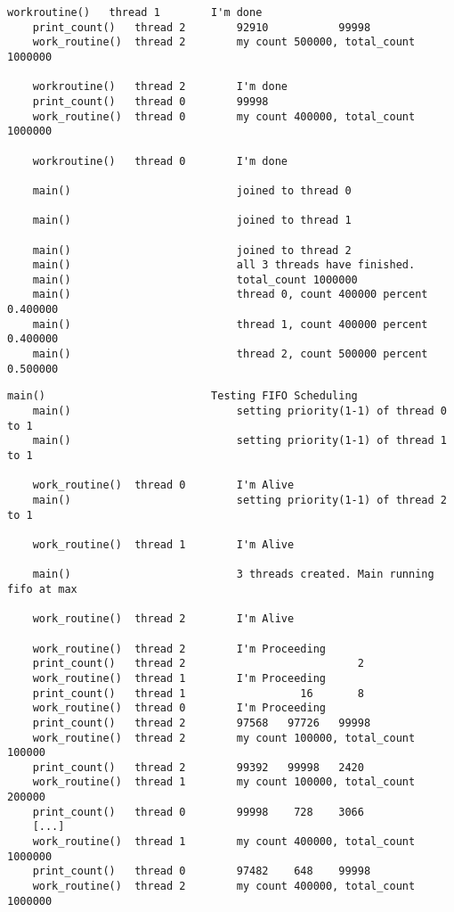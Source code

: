 \begin{parts}
\begin{solution}
\begin{Verbatim}[label={\$ sudo ./prog1 t}, fontsize=\small]
    workroutine()   thread 1        I'm done
    print_count()   thread 2        92910           99998
    work_routine()  thread 2        my count 500000, total_count 1000000
    
    workroutine()   thread 2        I'm done
    print_count()   thread 0        99998
    work_routine()  thread 0        my count 400000, total_count 1000000
    
    workroutine()   thread 0        I'm done
    
    main()                          joined to thread 0 
    
    main()                          joined to thread 1 
    
    main()                          joined to thread 2 
    main()                          all 3 threads have finished. 
    main()                          total_count 1000000
    main()                          thread 0, count 400000 percent 0.400000
    main()                          thread 1, count 400000 percent 0.400000
    main()                          thread 2, count 500000 percent 0.500000
    \end{Verbatim}
    \vspace{0.1em}
    \begin{Verbatim}[label={\$ sudo ./prog1 f}, fontsize=\small]
    main()                          Testing FIFO Scheduling
    main()                          setting priority(1-1) of thread 0 to 1
    main()                          setting priority(1-1) of thread 1 to 1
    
    work_routine()  thread 0        I'm Alive
    main()                          setting priority(1-1) of thread 2 to 1
    
    work_routine()  thread 1        I'm Alive
    
    main()                          3 threads created. Main running fifo at max
    
    work_routine()  thread 2        I'm Alive
    
    work_routine()  thread 2        I'm Proceeding
    print_count()   thread 2                           2
    work_routine()  thread 1        I'm Proceeding
    print_count()   thread 1                  16       8
    work_routine()  thread 0        I'm Proceeding
    print_count()   thread 2        97568   97726   99998
    work_routine()  thread 2        my count 100000, total_count 100000
    print_count()   thread 2        99392   99998   2420
    work_routine()  thread 1        my count 100000, total_count 200000
    print_count()   thread 0        99998    728    3066
    [...]
    work_routine()  thread 1        my count 400000, total_count 1000000
    print_count()   thread 0        97482    648    99998
    work_routine()  thread 2        my count 400000, total_count 1000000
    

\end{Verbatim}
\end{solution}
\end{parts}
